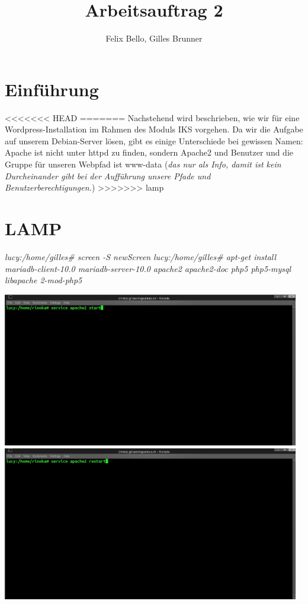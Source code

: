 \documentclass{article}
\author{Felix Bello, Gilles Brunner}
\title{Arbeitsauftrag 2}
\begin{document}
	\maketitle
	\section{Einführung}
<<<<<<< HEAD
=======
	Nachstehend wird beschrieben, wie wir für eine Wordpress-Installation im Rahmen des Moduls IKS vorgehen.
	Da wir die Aufgabe auf unserem Debian-Server lösen, gibt es einige Unterschiede bei gewissen Namen: Apache ist nicht unter httpd zu finden, sondern Apache2 und Benutzer und die Gruppe für unseren Webpfad ist www-data (\textit{das nur als Info, damit ist kein Durcheinander gibt bei der Aufführung unsere Pfade und Benutzerberechtigungen.})
>>>>>>> lamp
	\section{LAMP}
	\textit{lucy:/home/gilles\# screen -S newScreen}
	\newline
	\textit{lucy:/home/gilles\# apt-get install mariadb-client-10.0 mariadb-server-10.0 apache2 apache2-doc php5 php5-mysql libapache 2-mod-php5}
	\newline
	
	\includegraphics[width=13cm]{../Pics/start_apache}
	\includegraphics[width=13cm]{../Pics/apach2restart}
\end{document}
